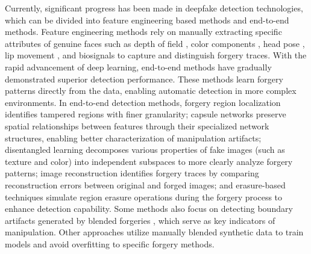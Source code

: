 \documentclass[final,5p,times]{elsarticle}
\begin{document}
Currently, significant progress has been made in deepfake detection technologies, which can be divided into feature engineering based methods and end-to-end methods. Feature engineering methods rely on manually extracting specific attributes of genuine faces such as depth of field \cite{2}, color components \cite{3}, head pose \cite{4}, lip movement \cite{5}, and biosignals \cite{6,7} to capture and distinguish forgery traces. With the rapid advancement of deep learning, end-to-end methods have gradually demonstrated superior detection performance. These methods learn forgery patterns directly from the data, enabling automatic detection in more complex environments. In end-to-end detection methods, forgery region localization \cite{8} identifies tampered regions with finer granularity; capsule networks \cite{9} preserve spatial relationships between features through their specialized network structures, enabling better characterization of manipulation artifacts; disentangled learning \cite{10,11} decomposes various properties of fake images (such as texture and color) into independent subspaces to more clearly analyze forgery patterns; image reconstruction \cite{12} identifies forgery traces by comparing reconstruction errors between original and forged images; and erasure-based techniques \cite{13} simulate region erasure operations during the forgery process to enhance detection capability. Some methods also focus on detecting boundary artifacts generated by blended forgeries \cite{14,15,16}, which serve as key indicators of manipulation. Other approaches \cite{17,18} utilize manually blended synthetic data to train models and avoid overfitting to specific forgery methods.
\end{document}
